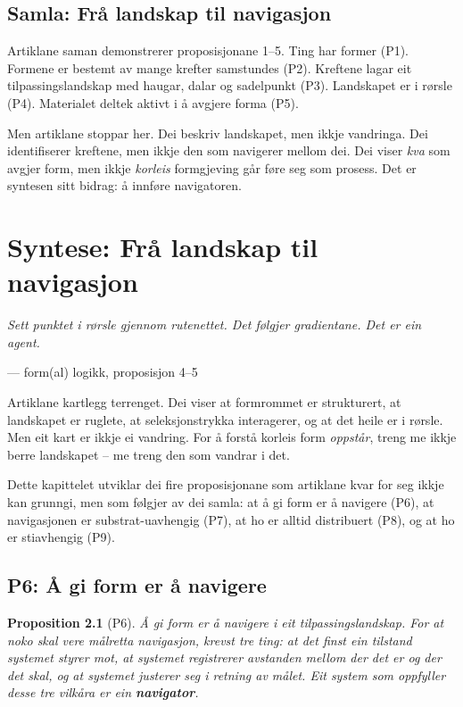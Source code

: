 \documentclass[12pt,a4paper,oneside]{report}
\newtheorem{proposition}[theorem]{Proposition}
\begin{document}
\section{Samla: Frå landskap til navigasjon}

Artiklane saman demonstrerer proposisjonane 1--5. Ting har former (P1). Formene er bestemt av mange krefter samstundes (P2). Kreftene lagar eit tilpassingslandskap med haugar, dalar og sadelpunkt (P3). Landskapet er i rørsle (P4). Materialet deltek aktivt i å avgjere forma (P5).

Men artiklane stoppar her. Dei beskriv landskapet, men ikkje vandringa. Dei identifiserer kreftene, men ikkje den som navigerer mellom dei. Dei viser \emph{kva} som avgjer form, men ikkje \emph{korleis} formgjeving går føre seg som prosess. Det er syntesen sitt bidrag: å innføre navigatoren.

\chapter{Syntese: Frå landskap til navigasjon}
\label{ch:syntese}

\epigraph{\itshape Sett punktet i rørsle gjennom rutenettet. Det følgjer gradientane. Det er ein agent.}{--- form(al) logikk, proposisjon 4--5}

Artiklane kartlegg terrenget. Dei viser at formrommet er strukturert, at landskapet er ruglete, at seleksjonstrykka interagerer, og at det heile er i rørsle. Men eit kart er ikkje ei vandring. For å forstå korleis form \emph{oppstår}, treng me ikkje berre landskapet -- me treng den som vandrar i det.

Dette kapittelet utviklar dei fire proposisjonane som artiklane kvar for seg ikkje kan grunngi, men som følgjer av dei samla: at å gi form er å navigere (P6), at navigasjonen er substrat-uavhengig (P7), at ho er alltid distribuert (P8), og at ho er stiavhengig (P9).

\section{P6: Å gi form er å navigere}
\label{sec:p6}

\begin{proposition}[P6]
Å gi form er å navigere i eit tilpassingslandskap. For at noko skal vere målretta navigasjon, krevst tre ting: at det finst ein tilstand systemet styrer mot, at systemet registrerer avstanden mellom der det er og der det skal, og at systemet justerer seg i retning av målet. Eit system som oppfyller desse tre vilkåra er ein \textbf{navigator}.
\end{proposition}
\end{document}
